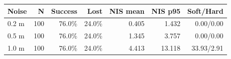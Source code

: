 \begin{tabular}{lrrrrrr}
\toprule
\textbf{Noise} & \textbf{N} & \textbf{Success} & \textbf{Lost} & \textbf{NIS mean} & \textbf{NIS p95} & \textbf{Soft/Hard} \\
\midrule
0.2 m & 100 & 76.0\% & 24.0\% & 0.405 & 1.432 & 0.00/0.00 \\
0.5 m & 100 & 76.0\% & 24.0\% & 1.345 & 3.757 & 0.00/0.00 \\
1.0 m & 100 & 76.0\% & 24.0\% & 4.413 & 13.118 & 33.93/2.91 \\
\bottomrule
\end{tabular}
